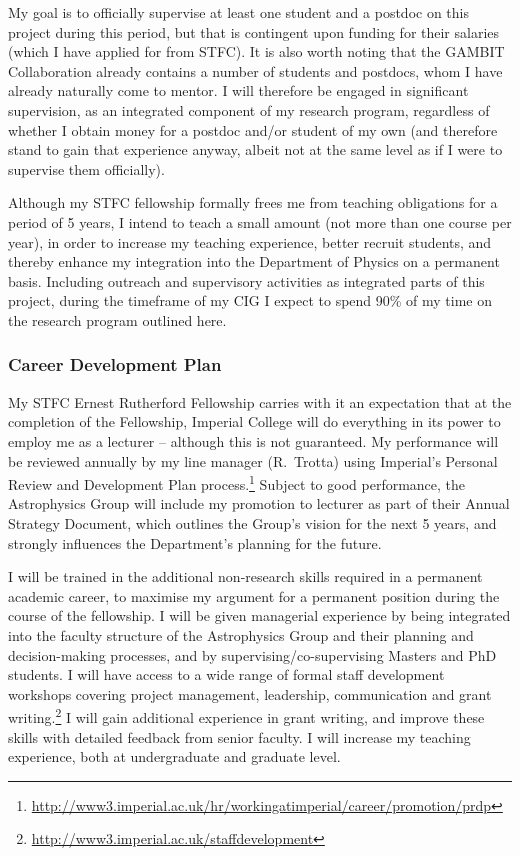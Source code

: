 \documentclass[a4paper,11pt]{article}
\begin{document}
\vspace{3mm}
\noindent My goal is to officially supervise at least one student and a postdoc on this project during this period, but that is contingent upon funding for their salaries (which I have applied for from STFC).  It is also worth noting that the GAMBIT Collaboration already contains a number of students and postdocs, whom I have already naturally come to mentor.  I will therefore be engaged in significant supervision, as an integrated component of my research program, regardless of whether I obtain money for a postdoc and/or student of my own (and therefore stand to gain that experience anyway, albeit not at the same level as if I were to supervise them officially).

Although my STFC fellowship formally frees me from teaching obligations for a period of 5 years, I intend to teach a small amount (not more than one course per year), in order to increase my teaching experience, better recruit students, and thereby enhance my integration into the Department of Physics on a permanent basis.  Including outreach and supervisory activities as integrated parts of this project, during the timeframe of my CIG I expect to spend 90\% of my time on the research program outlined here.

\subsubsection{Career Development Plan}

My STFC Ernest Rutherford Fellowship carries with it an expectation that at the completion of the Fellowship, Imperial College will do everything in its power to employ me as a lecturer -- although this is not guaranteed.  My performance will be reviewed annually by my line manager (R.\ Trotta) using Imperial's Personal Review and Development Plan process.\footnote{\href{http://www3.imperial.ac.uk/hr/workingatimperial/career/promotion/prdp}{http://www3.imperial.ac.uk/hr/workingatimperial/career/promotion/prdp}}  Subject to good performance, the Astrophysics Group will include my promotion to lecturer as part of their Annual Strategy Document, which outlines the Group's vision for the next 5 years, and strongly influences the Department's planning for the future.

I will be trained in the additional non-research skills required in a permanent academic career, to maximise my argument for a permanent position during the course of the fellowship.  I will be given managerial experience by being integrated into the faculty structure of the Astrophysics Group and their planning and decision-making processes, and by supervising/co-supervising Masters and PhD students.  I will have access to a wide range of formal staff development workshops covering project management, leadership, communication and grant writing.\footnote{\href{http://www3.imperial.ac.uk/staffdevelopment}{http://www3.imperial.ac.uk/staffdevelopment}}  I will gain additional experience in grant writing, and improve these skills with detailed feedback from senior faculty.  I will increase my teaching experience, both at undergraduate and graduate level.
\end{document}
